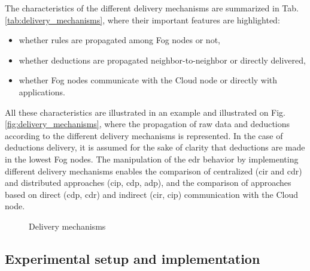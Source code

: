 \documentclass{iosart2c}
\begin{document}
The characteristics of the different delivery mechanisms are summarized in Tab. \ref{tab:delivery_mechanisms}, where their important features are highlighted: 
\begin{itemize}
	\item whether rules are propagated among Fog nodes or not,
	\item whether deductions are propagated neighbor-to-neighbor or directly delivered,
	\item whether Fog nodes communicate with the Cloud node or directly with applications. 
\end{itemize}  

	

All these characteristics are illustrated in an example and illustrated on Fig. \ref{fig:delivery_mechanisms}, where the propagation of raw data and deductions according to the different delivery mechanisms is represented. 
In the case of deductions delivery, it is assumed for the sake of clarity that deductions are made in the lowest Fog nodes. 
The manipulation of the \gls{edr} behavior by implementing different delivery mechanisms enables the comparison of centralized (\gls{cir} and \gls{cdr}) and distributed approaches (\gls{cip}, \gls{cdp}, \gls{adp}), and the comparison of approaches based on direct (\gls{cdp}, \gls{cdr}) and indirect (\gls{cir}, \gls{cip}) communication with the Cloud node. 

\begin{figure}
	\centering
	\caption{Delivery mechanisms}
	\scalebox{0.8}{
		
		\label{fig:delivery_mechanisms}	
	}
\end{figure}


\subsection{Experimental setup and implementation}
\label{sec:setup}
\end{document}
